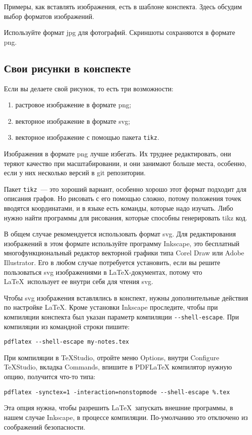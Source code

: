 \documentclass{article}
\begin{document}
    Примеры, как вставлять изображения, есть в шаблоне конспекта. Здесь обсудим выбор форматов изображений.

    Используйте формат jpg для фотографий. Скриншоты сохраняются в формате png.

    \subsection{Свои рисунки в конспекте}
    Если вы делаете свой рисунок, то есть три возможности:
    \begin{enumerate}
        \item растровое изображение в формате png;
        \item векторное изображение в формате svg;
        \item векторное изображение с помощью пакета \texttt{tikz}.
    \end{enumerate}

    Изображения в формате png лучше избегать. Их труднее редактировать, они теряют качество при масштабировании,
    и они занимают больше места, особенно, если у них несколько версий в git репозитории.

    Пакет \texttt{tikz}~--- это хороший вариант, особенно хорошо этот
    формат подходит для описания графов. Но рисовать с его помощью сложно, потому положения точек
    вводятся координатами, и в языке есть команды, которые надо изучать.
    Либо нужно найти программы для рисования, которые способны генерировать tikz код.

    В общем случае рекомендуется использовать формат svg. Для редактирования изображений в этом формате используйте программу
    Inkscape, это бесплатный многофункциональный редактор векторной графики типа Corel Draw или Adobe Illustrator.
    Его в любом случае потребуется установить, если вы решите пользоваться svg изображениями в \LaTeX-документах, потому что \LaTeX\ использует ее внутри себя для чтения svg.

    Чтобы svg изображения вставлялись в конспект, нужны дополнительные действия по настройке \LaTeX.
    Кроме установки Inkscape проследите, чтобы при компиляции конспекта был указан параметр компиляции
    \texttt{{-}-shell-escape}. При компиляции из командной строки пишите:
    \begin{verbatim}pdflatex --shell-escape my-notes.tex
    \end{verbatim}
    При компиляции в TeXStudio, отройте меню Options, внутри Configure TeXStudio, вкладка Commands, впишите
    в PDFLaTeX компилятор нужную опцию, получится что-то типа:
    \begin{verbatim}pdflatex -synctex=1 -interaction=nonstopmode --shell-escape %.tex
    \end{verbatim}
    Эта опция нужна, чтобы разрешить \LaTeX\ запускать внешние программы, в нашем случае Inkscape, в процессе
    компиляции. По-умолчанию это отключено из соображений безопасности.
\end{document}

